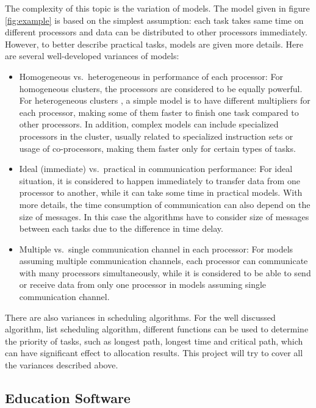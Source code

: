 \documentclass[a4paper,11pt]{article}
\begin{document}
The complexity of this topic is the variation of models. The model given in figure \ref{fig:example} is based on the simplest assumption: each task takes same time on different processors and data can be distributed to other processors immediately. However, to better describe practical tasks, models are given more details. Here are several well-developed variances of models:

\begin{itemize}
    \item Homogeneous vs.\ heterogeneous in performance of each processor: For homogeneous clusters, the processors are considered to be equally powerful. For heterogeneous clusters \cite{Topcuoglu}, a simple model is to have different multipliers for each processor, making some of them faster to finish one task compared to other processors. In addition, complex models can include specialized processors in the cluster, usually related to specialized instruction sets or usage of co-processors, making them faster only for certain types of tasks. 
    \item Ideal (immediate) vs.\ practical in communication performance: For ideal situation, it is considered to happen immediately to transfer data from one processor to another, while it can take some time in practical models. With more details, the time consumption of communication can also depend on the size of messages. In this case the algorithms have to consider size of messages between each tasks due to the difference in time delay.
    \item Multiple vs.\ single communication channel in each processor: For models assuming multiple communication channels, each processor can communicate with many processors simultaneously, while it is considered to be able to send or receive data from only one processor in models assuming single communication channel.
\end{itemize}

There are also variances in scheduling algorithms. For the well discussed algorithm, list scheduling algorithm, different functions can be used to determine the priority of tasks, such as longest path, longest time and critical path, which can have significant effect to allocation results. This project will try to cover all the variances described above.

\subsection{Education Software}
\end{document}
